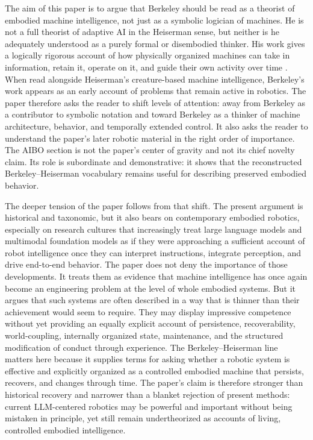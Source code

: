 \documentclass[11pt]{article}
\begin{document}
The aim of this paper is to argue that Berkeley should be read as a theorist of embodied machine intelligence, not just as a symbolic logician of machines. He is not a full theorist of adaptive AI in the Heiserman sense, but neither is he adequately understood as a purely formal or disembodied thinker. His work gives a logically rigorous account of how physically organized machines can take in information, retain it, operate on it, and guide their own activity over time \citep[pp.~66--70]{berkeley1959symbolic}. When read alongside Heiserman's creature-based machine intelligence, Berkeley's work appears as an early account of problems that remain active in robotics. The paper therefore asks the reader to shift levels of attention: away from Berkeley as a contributor to symbolic notation and toward Berkeley as a thinker of machine architecture, behavior, and temporally extended control. It also asks the reader to understand the paper's later robotic material in the right order of importance. The AIBO section is not the paper's center of gravity and not its chief novelty claim. Its role is subordinate and demonstrative: it shows that the reconstructed Berkeley--Heiserman vocabulary remains useful for describing preserved embodied behavior.

The deeper tension of the paper follows from that shift. The present argument is historical and taxonomic, but it also bears on contemporary embodied robotics, especially on research cultures that increasingly treat large language models and multimodal foundation models as if they were approaching a sufficient account of robot intelligence once they can interpret instructions, integrate perception, and drive end-to-end behavior. The paper does not deny the importance of those developments. It treats them as evidence that machine intelligence has once again become an engineering problem at the level of whole embodied systems. But it argues that such systems are often described in a way that is thinner than their achievement would seem to require. They may display impressive competence without yet providing an equally explicit account of persistence, recoverability, world-coupling, internally organized state, maintenance, and the structured modification of conduct through experience. The Berkeley--Heiserman line matters here because it supplies terms for asking whether a robotic system is effective and explicitly organized as a controlled embodied machine that persists, recovers, and changes through time. The paper's claim is therefore stronger than historical recovery and narrower than a blanket rejection of present methods: current LLM-centered robotics may be powerful and important without being mistaken in principle, yet still remain undertheorized as accounts of living, controlled embodied intelligence.
\end{document}
